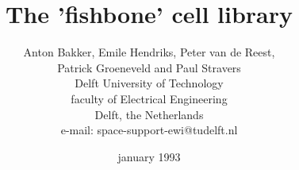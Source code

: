 \newcommand{\smc}[1]{{\sc #1}}
\newcommand{\ii}{\"{\i}}


\newcommand{\topdir}{.}

\setlength{\parskip}{0.6\baselineskip} \setlength{\parindent}{0cm}

\newcommand{\type}[1]{\begin{quote}%
                         {\tt [op5/op5u9] ~ #1}%
                      \end{quote}}
\newcommand{\typeb}[2]{\begin{quote}%
                         {\tt [op5/op5u9] ~ #1%
                              \newline%
                              [op5/op5u9] ~ #2}%
                       \end{quote}}

\newcommand{\layer}[1]{{\sf #1}}
\newcommand{\mask}[1]{{\sf #1}}
\newcommand{\tool}[1]{{\sl #1\/}}
\newcommand{\button}[1]{{\fbox{\small\rule[-0.5ex]{0mm}{2ex}$\!\!\!\!$\sf ~ #1}}}
\newcommand{\fname}[1]{{\tt #1}}
\newcommand{\callpsfig}[2]{\psfig{figure=\topdir/plaatjes/#1,#2}}
\newcommand{\attention}[2]{\begin{description}\item[{\bf #1}] #2 \end{description}}
\newcommand{\warning}[1]{\begin{description}\item[{\bf Warning}:] #1 \end{description}}
\sloppy


\title{The 'fishbone' cell library}
\author{Anton Bakker, Emile Hendriks, Peter van de Reest,\\
Patrick Groeneveld and Paul Stravers\vspace*{1cm}\\
Delft University of Technology\\
faculty of Electrical Engineering\\
Delft, the Netherlands\\
e-mail: space-support-ewi@tudelft.nl}
\date{january 1993}
\maketitle

